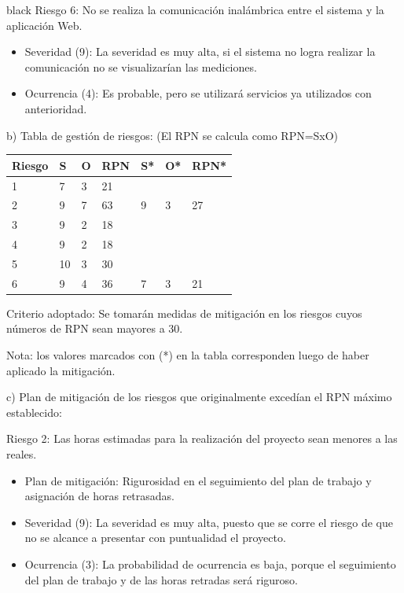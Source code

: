 \documentclass[11pt]{charter}
\begin{document}
\begin{consigna}{black}
Riesgo 6: No se realiza la comunicación inalámbrica entre el sistema y la aplicación Web.
\begin{itemize}
\item Severidad (9): La severidad es muy alta, si el sistema no logra realizar la comunicación no se visualizarían las mediciones.
\item Ocurrencia (4): Es probable, pero se utilizará servicios ya utilizados con anterioridad.
\end{itemize}

b) Tabla de gestión de riesgos:      (El RPN se calcula como RPN=SxO)
\begin{table}[htpb]
\centering
\begin{tabularx}{\linewidth}{@{}|X|X|X|X|X|X|X|@{}}
\hline
\rowcolor[HTML]{C0C0C0} 
Riesgo & S & O & RPN & S* & O* & RPN* \\ \hline
   1  & 7 & 3 & 21  &    &    &      \\ \hline
   2   & 9 & 7 & 63  &  9 & 3  & 27   \\ \hline
   3   & 9 & 2 & 18  &    &    &      \\ \hline
   4   & 9 & 2 & 18  &    &    &      \\ \hline
   5   & 10 & 3 & 30 &    &    &      \\ \hline
   6   & 9 & 4 & 36  &  7 & 3  & 21    \\ \hline
\end{tabularx}%
\end{table}

Criterio adoptado: 
Se tomarán medidas de mitigación en los riesgos cuyos números de RPN sean mayores a 30.

Nota: los valores marcados con (*) en la tabla corresponden luego de haber aplicado la mitigación.

c) Plan de mitigación de los riesgos que originalmente excedían el RPN máximo establecido:
 
Riesgo 2: Las horas estimadas para la realización del proyecto sean menores a las reales.
\begin{itemize}
\item Plan de mitigación: Rigurosidad en el seguimiento del plan de trabajo y asignación de horas retrasadas. 
\item Severidad (9): La severidad es muy alta, puesto que se corre el riesgo de que no se alcance a presentar con puntualidad el proyecto. 
\item Ocurrencia (3): La probabilidad de ocurrencia es baja, porque el seguimiento del plan de trabajo y de las horas retradas será riguroso. 
\end{itemize}


\end{consigna}
\end{document}
